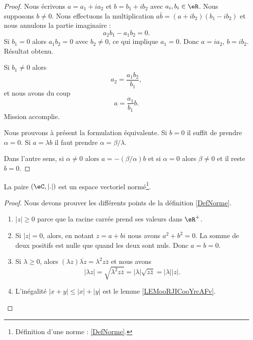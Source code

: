 \begin{proof}
    Nous écrivons \( a=a_1+ia_2\) et \( b=b_1+ib_2\) avec \( a_i,b_i\in \eR\). Nous supposons \( b\neq 0\). Nous effectuons la multiplication \( a\bar b=(a+ib_2)(b_1-ib_2)\) et nous annulons la partie imaginaire :
    \begin{equation}
        a_2b_1-a_1b_2=0.
    \end{equation}
    Si \( b_1=0\) alors \( a_1b_2=0\) avec \( b_2\neq 0\), ce qui implique \( a_1=0\). Donc \( a=ia_2\), \( b=ib_2\). Résultat obtenu.

    Si \( b_1\neq 0\) alors 
    \begin{equation}
        a_2=\frac{ a_1b_2 }{ b_1 },
    \end{equation}
    et nous avons du coup
    \begin{equation}
        a=\frac{ a_1 }{ b_1 }b.
    \end{equation}
    Mission accomplie.

    Nous prouvons à présent la formulation équivalente. Si \( b=0\) il suffit de prendre \( \alpha=0\). Si \( a=\lambda b\) il faut prendre \( \alpha=\beta/\lambda\).

    Dans l'autre sens, si \( \alpha\neq 0\) alors \( a=-(\beta/\alpha)b\) et si \( \alpha=0\) alors \( \beta\neq 0\) et il reste \( b=0\).
\end{proof}

\begin{proposition}
    La paire \( (\eC, | . |)\) est un espace vectoriel normé\footnote{Définition d'une norme : \ref{DefNorme}.}.
\end{proposition}

\begin{proof}
    Nous devons prouver les différents points de la définition \ref{DefNorme}.
    \begin{enumerate}
        \item
            \( | z |\geq 0\) parce que la racine carrée prend ses valeurs dans \( \eR^+\).
        \item
            Si \( | z |=0\), alors, en notant \( z=a+bi\) nous avons \( a^2+b^2=0\). La somme de deux positifs est nulle que quand les deux sont nuls. Donc \( a=b=0\).
        \item
            Si \( \lambda\geq 0\), alors \( (\lambda z)\overline{ \lambda z }=\lambda^2z\bar z\) et nous avons
            \begin{equation}
                | \lambda z |=\sqrt{ \lambda^2z\bar z }=| \lambda |\sqrt{ z\bar z }=| \lambda | |z |.
            \end{equation}
        \item
            L'inégalité \( | x+y |\leq | x |+| y |\) est le lemme \ref{LEMooRJICooYrcAFv}.
    \end{enumerate}
\end{proof}



